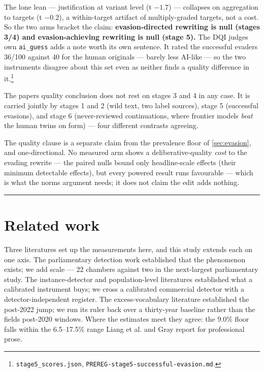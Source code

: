 The lone lean --- justification at variant level (t \(-1.7\)) --- collapses on
aggregation to targets (t \(-0.2\)), a within-target artifact of multiply-graded
targets, not a cost. So the two arms bracket the claim: \textbf{evasion-directed
rewriting is null (stages 3/4) and evasion-achieving rewriting is null (stage
5).} The DQI judge\textquotesingle s own \texttt{ai\_guess} adds a note worth its own sentence. It rated the
successful evaders 36/100 against 40 for the human originals --- barely less
AI-like --- so the two instruments disagree about this set even as neither finds
a quality difference in it.\footnote{\texttt{stage5\_scores.json}, \texttt{PREREG-\allowbreak{}stage5-\allowbreak{}successful-\allowbreak{}evasion.\allowbreak{}md}.}

The paper\textquotesingle s quality conclusion does not rest on stages 3 and 4 in any case. It
is carried jointly by stages 1 and 2 (wild text, two label sources), stage 5
(successful evasions), and stage 6 (never-reviewed continuations, where
frontier models \emph{beat} the human twins on form) --- four different contrasts
agreeing.

The quality clause is a separate claim from the prevalence floor of \cref{sec:evasion},
and one-directional. No measured arm shows a deliberative-quality \emph{cost} to
the evading rewrite --- the paired nulls bound only headline-scale effects
(their minimum detectable effects), but every powered result runs favourable
--- which is what the norms argument needs; it does not claim the edit adds
nothing.

\begin{center}\rule{0.5\linewidth}{0.5pt}\end{center}

\section{Related work}\label{sec:related}

Three literatures set up the measurements here, and this study extends each on
one axis. The parliamentary detection work established that the phenomenon
exists; we add scale --- 22 chambers against two in the next-largest
parliamentary study. The instance-detector and population-level literatures
established what a calibrated instrument buys; we cross a calibrated commercial
detector with a detector-independent register. The excess-vocabulary literature
established the post-2022 jump; we run its ruler back over a thirty-year
baseline rather than the field\textquotesingle s post-2020 windows. Where the estimates meet
they agree: the 9.0\% floor falls within the 6.5--17.5\% range Liang et al.\cite{liang2024monitoring,liang2025quantifying} and Gray\cite{gray2025} report for professional prose.

